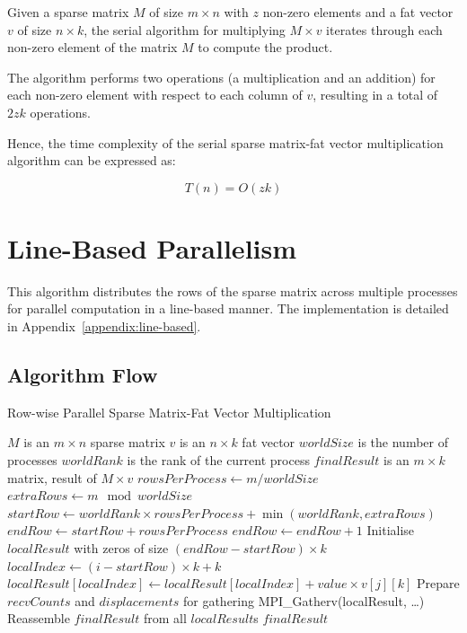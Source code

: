 \documentclass[12pt,oneside]{book} %
\begin{document}
Given a sparse matrix $M$ of size $m \times n$ with $z$ non-zero elements and a
fat vector $v$ of size $n \times k$, the serial algorithm for multiplying \(M
\times v\) iterates through each non-zero element of the matrix \(M\) to
compute the product.

The algorithm performs two operations (a multiplication and an addition) for
each non-zero element with respect to each column of \(v\), resulting in a
total of \(2zk\) operations.

Hence, the time complexity of the serial sparse matrix-fat vector
multiplication algorithm can be expressed as:

\begin{equation}
    T(n) = O(zk)
\end{equation}

\newpage
\section{Line-Based Parallelism}
This algorithm distributes the rows of the sparse matrix across multiple
processes for parallel computation in a line-based manner. The implementation
is detailed in Appendix~\ref{appendix:line-based}.

\subsection{Algorithm Flow}

\begin{algorithm}[H]
    \caption{Row-wise Parallel Sparse Matrix-Fat Vector Multiplication}
    \begin{algorithmic}
        \Require $M$ is an $m \times n$ sparse matrix
        \Require $v$ is an $n \times k$ fat vector
        \Require $worldSize$ is the number of processes
        \Require $worldRank$ is the rank of the current process
        \Ensure  $finalResult$ is an $m \times k$ matrix, result of $M \times v$
        \State $rowsPerProcess \gets m / worldSize$
        \State $extraRows \gets m \mod worldSize$
        \State $startRow \gets worldRank \times rowsPerProcess + \min(worldRank, extraRows)$
        \State $endRow \gets startRow + rowsPerProcess$
        \State $endRow \gets endRow + 1$
        \EndIf
        \State Initialise $localResult$ with zeros of size $(endRow - startRow) \times k$
        \State $localIndex \gets (i - startRow) \times k + k$
        \State $localResult[localIndex] \gets localResult[localIndex] + value \times v[j][k]$
        \EndFor
        \EndFor
        \EndFor
        \State Prepare $recvCounts$ and $displacements$ for gathering
        \EndIf
        \State MPI\_Gatherv(localResult, \ldots)
        \State Reassemble $finalResult$ from all $localResult$s
        \State \Return $finalResult$
        \EndIf
    \end{algorithmic}
\end{algorithm}
\end{document}
